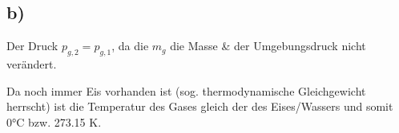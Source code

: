 

\subsection*{b)}

Der Druck $p_{g,2} = p_{g,1}$, da die $m_g$ die Masse \& der Umgebungsdruck nicht verändert.

Da noch immer Eis vorhanden ist (sog. thermodynamische Gleichgewicht herrscht) ist die Temperatur des Gases gleich der des Eises/Wassers und somit 0°C bzw. 273.15 K.